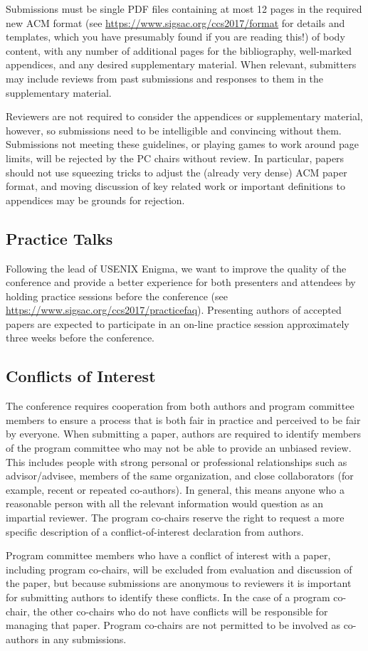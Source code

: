 Submissions must be single PDF files containing at most 12 pages in
the required new ACM format (see
\url{https://www.sigsac.org/ccs2017/format} for details and templates,
which you have presumably found if you are reading this!) of body
content, with any number of additional pages for the bibliography,
well-marked appendices, and any desired supplementary material.  When
relevant, submitters may include reviews from past submissions and
responses to them in the supplementary material.

Reviewers are not required to consider the appendices or supplementary
material, however, so submissions need to be intelligible and
convincing without them.  Submissions not meeting these guidelines, or
playing games to work around page limits, will be rejected by the PC
chairs without review.  In particular, papers should not use squeezing
tricks to adjust the (already very dense) ACM paper format, and moving
discussion of key related work or important definitions to appendices
may be grounds for rejection.

\subsection{Practice Talks}

Following the lead of USENIX Enigma, we want to improve the quality of
the conference and provide a better experience for both presenters and
attendees by holding practice sessions before the conference (see
\url{https://www.sigsac.org/ccs2017/practicefaq}). Presenting authors
of accepted papers are expected to participate in an on-line practice
session approximately three weeks before the conference.

\subsection{Conflicts of Interest}

The conference requires cooperation from both authors and program
committee members to ensure a process that is both fair in practice
and perceived to be fair by everyone. When submitting a paper, authors
are required to identify members of the program committee who may not
be able to provide an unbiased review.  This includes people with
strong personal or professional relationships such as advisor/advisee,
members of the same organization, and close collaborators (for
example, recent or repeated co-authors). In general, this means anyone
who a reasonable person with all the relevant information would
question as an impartial reviewer. The program co-chairs reserve the
right to request a more specific description of a conflict-of-interest
declaration from authors.

Program committee members who have a conflict of interest with a
paper, including program co-chairs, will be excluded from evaluation
and discussion of the paper, but because submissions are anonymous to
reviewers it is important for submitting authors to identify these
conflicts. In the case of a program co-chair, the other co-chairs who
do not have conflicts will be responsible for managing that paper.
Program co-chairs are not permitted to be involved as co-authors in
any submissions.

